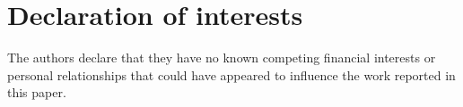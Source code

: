 \documentclass[reqno]{amsart}
\theoremstyle{definition}
\theoremstyle{plain}
\theoremstyle{remark}
\numberwithin{equation}{section}
\begin{document}
\section{Declaration of interests}
The authors declare that they have no known competing financial interests or personal relationships that could have appeared to influence the work reported in this paper.



\end{document}
